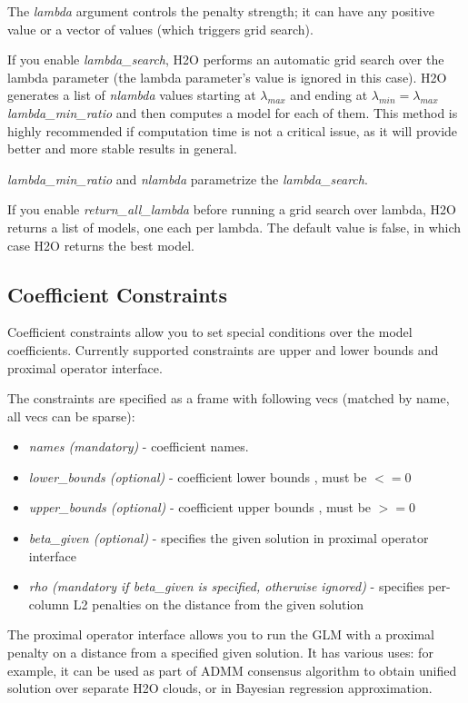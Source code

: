 \documentclass[11pt]{article}
\begin{document}
The \textit{lambda} argument controls the penalty strength; it can have any positive value or a vector of values (which triggers grid search).

If you enable \textit{lambda\_search}, H2O performs an automatic grid search over the lambda parameter (the lambda parameter's value is ignored in this case). H2O generates a list of \textit{nlambda} values starting at $\lambda_{max}$ and ending at $\lambda_{min} = \lambda_{max}$ \textit{lambda\_min\_ratio} and then computes a model for each of them.
This method is highly recommended if computation time is not a critical issue, as it will provide better and more stable results in general. 
 
\textit{lambda\_min\_ratio} and \textit{nlambda} parametrize the \textit{lambda\_search}.

If you enable \textit{return\_all\_lambda} before running a grid search over lambda, H2O returns a list of models, one each per lambda. The default value is false, in which case H2O returns the best model.  

\subsection{Coefficient Constraints}
Coefficient constraints allow you to set special conditions over the model coefficients. Currently supported constraints are upper and lower bounds and proximal operator \cite{prox} interface. 

The constraints are specified as a frame with following vecs (matched by name, all vecs can be sparse):
\begin{itemize}
\item \textit{names (mandatory)}  - coefficient names. 
\item \textit{lower\_bounds (optional)} - coefficient lower bounds , must be $<= 0$
\item \textit{upper\_bounds (optional)} - coefficient upper bounds , must be $>= 0$
\item \textit{beta\_given (optional)} - specifies the given solution in proximal operator interface
\item \textit{rho (mandatory if beta\_given is specified, otherwise ignored)} - specifies per-column L2 penalties on the distance from the given solution
\end{itemize}
 
The proximal operator interface allows you to run the GLM with a proximal penalty on a distance from a specified given solution. It has various uses: for example, it can be used as part of ADMM consensus algorithm to obtain unified solution over separate H2O clouds, or in Bayesian regression approximation.
\end{document}
